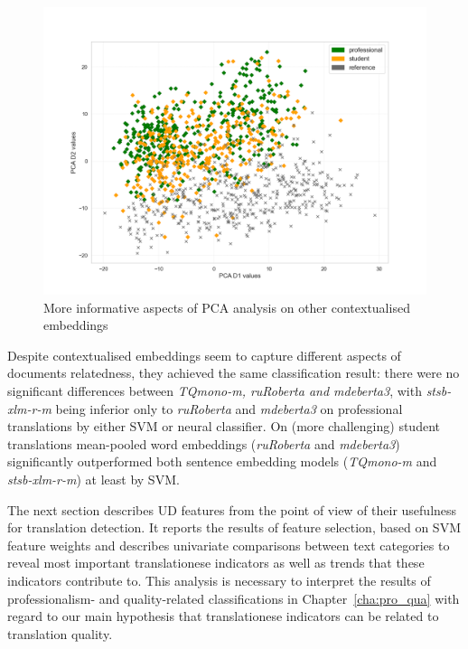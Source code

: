 \begin{figure}[H]
\begin{minipage}[c]{0.31\linewidth}
	\includegraphics[width=\linewidth]{figures/pca/var-ttype-ruRoberta-large-PCA-scatter}
\end{minipage}
\caption{\label{fig:other}More informative aspects of PCA analysis on other contextualised embeddings}	
\end{figure}


Despite contextualised embeddings seem to capture different aspects of documents relatedness, they achieved the same classification result: there were no significant differences between \textit{TQmono-m, ruRoberta and mdeberta3}, with \textit{stsb-xlm-r-m} being inferior only to \textit{ruRoberta} and \textit{mdeberta3} on professional translations by either SVM or neural classifier. 
On (more challenging) student translations mean-pooled word embeddings (\textit{ruRoberta} and \textit{mdeberta3}) significantly outperformed both sentence embedding models (\textit{TQmono-m} and \textit{stsb-xlm-r-m}) at least by SVM.

The next section describes UD features from the point of view of their usefulness for translation detection. It reports the results of feature selection, based on SVM feature weights and describes univariate comparisons between text categories to reveal most important translationese indicators as well as trends that these indicators contribute to. This analysis is necessary to interpret the results of professionalism- and quality-related classifications in Chapter~\ref{cha:pro_qua} with regard to our main hypothesis that translationese indicators can be related to translation quality.

